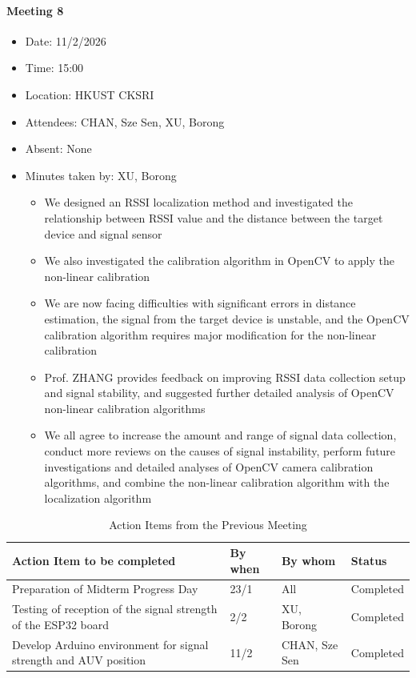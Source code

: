 \documentclass[11pt]{article}
\begin{document}
    \paragraph{Meeting 8}
    \begin{itemize}
        \item Date: 11/2/2026
        \item Time: 15:00
        \item Location: HKUST CKSRI
        \item Attendees: CHAN, Sze Sen, XU, Borong
        \item Absent: None
        \item Minutes taken by: XU, Borong
        \begin{itemize}
            \item We designed an RSSI localization method and investigated the relationship between RSSI value and the distance between the target device and signal sensor
            \item We also investigated the calibration algorithm in OpenCV to apply the non-linear calibration
            \item We are now facing difficulties with significant errors in distance estimation, the signal from the target device is unstable, and the OpenCV calibration algorithm requires major modification for the non-linear calibration
            \item Prof. ZHANG provides feedback on improving RSSI data collection setup and signal stability, and suggested further detailed analysis of OpenCV non-linear calibration algorithms
            \item We all agree to increase the amount and range of signal data collection, conduct more reviews on the causes of signal instability, perform future investigations and detailed analyses of OpenCV camera calibration algorithms, and combine the non-linear calibration algorithm with the localization algorithm
        \end{itemize}
    \end{itemize}
    
    \begin{longtable}[c]{|l|l|l|l|}
        \caption{Action Items from the Previous Meeting}\\
        \hline
        \textbf{Action Item to be completed} & \textbf{By when} & \textbf{By whom} & \textbf{Status} \\
        \hline
        \endhead
        Preparation of Midterm Progress Day & 23/1 & All & Completed \\
        \hline
        Testing of reception of the signal strength of the ESP32 board & 2/2 & XU, Borong & Completed \\
        \hline
        Develop Arduino environment for signal strength and AUV position & 11/2 & CHAN, Sze Sen & Completed \\
        \hline
    \end{longtable}
    
\end{document}
